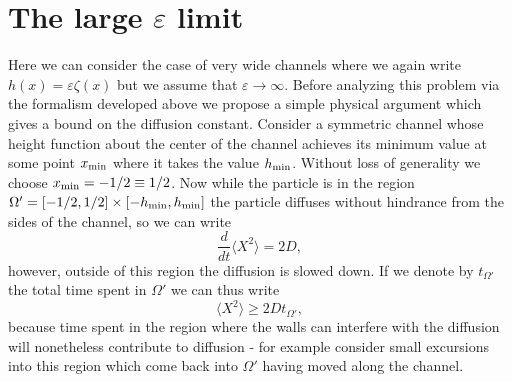 \documentclass[pre,showpacs,preprintnumbers,amsmath,amssymb,superscriptaddress]{revtex4-1}
\begin{document}
{{\section{The large $\varepsilon$ limit}\label{largee}
\label{Sec6}
Here we can consider the case of very wide channels where we again write $h(x)=\varepsilon\zeta(x)$ but we assume that $\varepsilon\to\infty$. Before analyzing this problem via the formalism developed above 
we propose a simple physical argument which gives a bound on the diffusion constant. 
Consider a symmetric channel whose height function about the center of the channel achieves its minimum value at some point $x_{\rm min}$ where it takes the value $h_{\rm min}$. Without loss of generality we choose $x_{\rm min}=-1/2\equiv 1/2$. Now while the particle is in the region
$\Omega' = [-1/2,1/2]\times[-h_{\rm min},h_{\rm min}]$ the particle diffuses without hindrance from the sides of the channel, so we can write
\begin{equation}
\frac{d}{dt}\langle X^2 \rangle = 2D,
\end{equation}
however, outside of this region the diffusion is slowed down. If we denote by $t_{\Omega'}$ the total time spent in  $\Omega'$ we can thus write
\begin{equation}
\langle X^2 \rangle \geq 2Dt_{\Omega'},
\end{equation}
because time spent in the region where the walls can interfere with the diffusion will nonetheless 
contribute to diffusion - for example consider small excursions into this region which come back into $\Omega'$ having moved along the channel. 


}}
\end{document}
